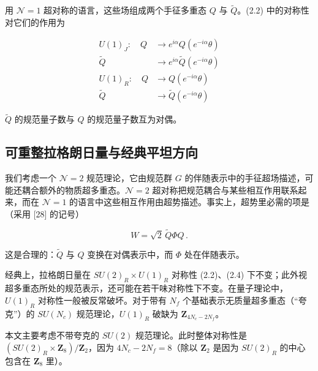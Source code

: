 \documentclass[11pt,a4paper,UTF8,fontset=fandol]{ctexart}
\theoremstyle{plain}
\theoremstyle{definition}
\begin{document}
\begin{enumerate}
用 $\mathcal N=1$ 超对称的语言，这些场组成两个手征多重态 $Q$ 与 $\tilde Q$。(2.2) 中的对称性对它们的作用为

\begin{equation}
\begin{aligned}
U(1)_J:\quad Q &\to e^{i\alpha}Q(e^{-i\alpha}\theta)\\
\tilde Q &\to e^{i\alpha}\tilde Q(e^{-i\alpha}\theta)\\[2pt]
U(1)_R:\quad Q &\to Q(e^{-i\alpha}\theta)\\
\tilde Q &\to \tilde Q(e^{-i\alpha}\theta)
\end{aligned}\tag{2.4}
\end{equation}

$\tilde Q$ 的规范量子数与 $Q$ 的规范量子数互为对偶。

\end{enumerate}

\subsection{可重整拉格朗日量与经典平坦方向}

我们考虑一个 $\mathcal N=2$ 规范理论，它由规范群 $G$ 的伴随表示中的手征超场描述，可能还耦合额外的物质超多重态。$\mathcal N=2$ 超对称把规范耦合与某些相互作用联系起来，而在 $\mathcal N=1$ 的语言中这些相互作用由超势描述。事实上，超势里必需的项是（采用 [28] 的记号）

\begin{equation}
W=\sqrt2\,\tilde Q\Phi Q\,.\tag{2.5}
\end{equation}

这是合理的：$\tilde Q$ 与 $Q$ 变换在对偶表示中，而 $\Phi$ 处在伴随表示。

经典上，拉格朗日量在 $SU(2)_R\times U(1)_R$ 对称性 (2.2)、(2.4) 下不变；此外视超多重态所处的规范表示，还可能在若干味对称性下不变。在量子理论中，$U(1)_R$ 对称性一般被反常破坏。对于带有 $N_f$ 个基础表示无质量超多重态（“夸克”）的 $SU(N_c)$ 规范理论，$U(1)_R$ 破缺为 $\mathbf Z_{4N_c-2N_f}$。

本文主要考虑不带夸克的 $SU(2)$ 规范理论。此时整体对称性是 $(SU(2)_R\times\mathbf Z_8)/\mathbf Z_2$，因为 $4N_c-2N_f=8$（除以 $\mathbf Z_2$ 是因为 $SU(2)_R$ 的中心包含在 $\mathbf Z_8$ 里）。
\end{document}
